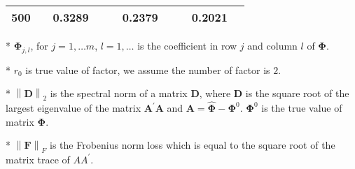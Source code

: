 \documentclass[12pt,a4paper,hyperref]{article}
\begin{document}
\begin{table}[H]
\begin{threeparttable}
\begin{tabular} {*{10}{c}}
500& & 0.3289& &  &0.2379 & & &0.2021 & \\
\bottomrule
\end{tabular}
\begin{tablenotes}
\footnotesize
  \item[*] $\boldsymbol{\Phi}_{j,l}$, for $j=1,\ldots m$, $l=1,\ldots$ is the coefficient in row $j$ and column $l$ of $\boldsymbol{\Phi}$.
\item[*] $r_{0}$ is true value of factor, we assume the number of factor is $2$.
 \item[*] $\left\| \boldsymbol{D} \right\|_{2}$ is the spectral norm of a matrix $\boldsymbol{D}$, where $\boldsymbol{D}$ is the square root of the largest eigenvalue of the matrix $\boldsymbol{A}^{'}\boldsymbol{A}$ and $\boldsymbol{A}=\hat{\boldsymbol{\Phi}}- \boldsymbol{\Phi}^{0}$. $\boldsymbol{\Phi}^{0}$ is the true value of matrix $\boldsymbol{\Phi}$.
 \item[*] $\left\| \boldsymbol{F} \right\|_{F} $ is the Frobenius norm loss which is equal to the square root of the matrix trace of $AA^{'}$.
    \end{tablenotes}
\end{threeparttable}
\end{table}
\end{document}
